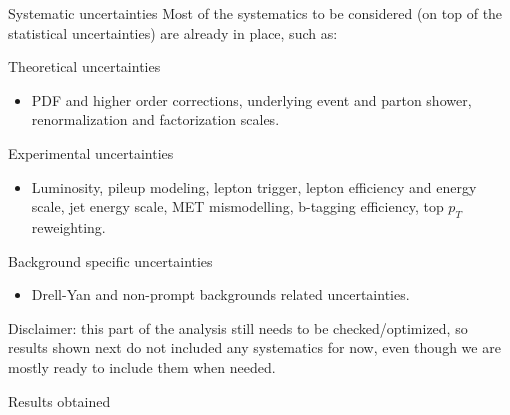 \documentclass[8pt]{beamer}
\begin{document}
\begin{frame}{Systematic uncertainties}
\justifying
Most of the systematics to be considered (on top of the statistical uncertainties) are already in place, such as: \vfill

\begin{block}{\centering Theoretical uncertainties}\end{block} 

\begin{itemize}
\justifying
\item PDF and higher order corrections, underlying event and parton shower, renormalization and factorization scales.
\end{itemize} \vfill

\begin{block}{\centering Experimental uncertainties}\end{block}

\begin{itemize}
\justifying
\item Luminosity, pileup modeling, lepton trigger, lepton efficiency and energy scale, jet energy scale, MET mismodelling, b-tagging efficiency, top $p_T$ reweighting.
\end{itemize} \vfill

\begin{block}{\centering Background specific uncertainties}\end{block}

\begin{itemize}
\justifying
\item Drell-Yan and non-prompt backgrounds related uncertainties.
\end{itemize} \vfill

\alert{Disclaimer}: this part of the analysis still needs to be checked/optimized, so results shown next do not included any systematics for now, even though we are mostly ready to include them when needed. \vfill
\end{frame}

\begin{frame}[standout]
Results obtained
\end{frame}
\end{document}
